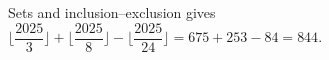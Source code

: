Sets and inclusion--exclusion gives $\lfloor\dfrac{2025}{3}\rfloor+\lfloor\dfrac{2025}{8}\rfloor-\lfloor\dfrac{2025}{24}\rfloor=675+253-84=\boxed{844}$.
